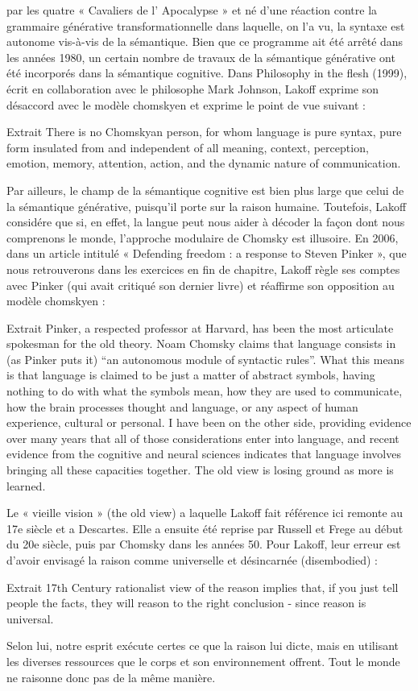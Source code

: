 par les quatre « Cavaliers de l’ Apocalypse » et né d’une réaction contre la grammaire générative transformationnelle dans laquelle, on l’a vu, la syntaxe est autonome vis-à-vis de la sémantique. Bien que ce programme ait été arrêté dans les années 1980, un certain nombre de travaux de la sémantique générative ont été incorporés dans la sémantique cognitive. Dans Philosophy in the flesh (1999), écrit en collaboration avec le philosophe Mark Johnson, Lakoff exprime son désaccord avec le modèle chomskyen et exprime le point de vue suivant : 
\begin{lecture}{Extrait}
There is no Chomskyan person, for whom language is pure syntax, pure form insulated from and independent of all meaning, context, perception, emotion, memory, attention, action, and the dynamic nature of communication.
\end{lecture}
 Par ailleurs, le champ de la sémantique cognitive est bien plus large que celui de la sémantique générative, puisqu’il porte sur la raison humaine. Toutefois, Lakoff considére que si, en effet, la langue peut nous aider à décoder la façon dont nous comprenons le monde, l’approche modulaire de Chomsky est illusoire. En 2006, dans un article intitulé « Defending freedom : a response to Steven Pinker », que nous retrouverons dans les exercices en fin de chapitre, Lakoff règle ses comptes avec Pinker (qui avait critiqué son dernier livre) et réaffirme son opposition au modèle chomskyen : 
\begin{lecture}{Extrait}
Pinker, a respected professor at Harvard, has been the most articulate spokesman for the old theory. Noam Chomsky claims that language consists in (as Pinker puts it) “an autonomous module of syntactic rules”. What this means is that language is claimed to be just a matter of abstract symbols, having nothing to do with what the symbols mean, how they are used to communicate, how the brain processes thought and language, or any aspect of human experience, cultural or personal. I have been on the other side, providing evidence over many years that all of those considerations enter into language, and recent evidence from the cognitive and neural sciences indicates that language involves bringing all these capacities together. The old view is losing ground as more is learned.
\end{lecture}
 Le « vieille vision » (the old view) a laquelle Lakoff fait référence ici remonte au 17e siècle et a Descartes. Elle a ensuite été reprise par Russell et Frege au début du 20e siècle, puis par Chomsky dans les années 50. Pour Lakoff, leur erreur est d’avoir envisagé la raison comme universelle et désincarnée (disembodied) : 
\begin{lecture}{Extrait}
17th Century rationalist view of the reason implies that, if you just tell people the facts, they will reason to the right conclusion - since reason is universal.
\end{lecture}
 Selon lui, notre esprit exécute certes ce que la raison lui dicte, mais en utilisant les diverses ressources que le corps et son environnement offrent. Tout le monde ne raisonne donc pas de la même manière.\par

